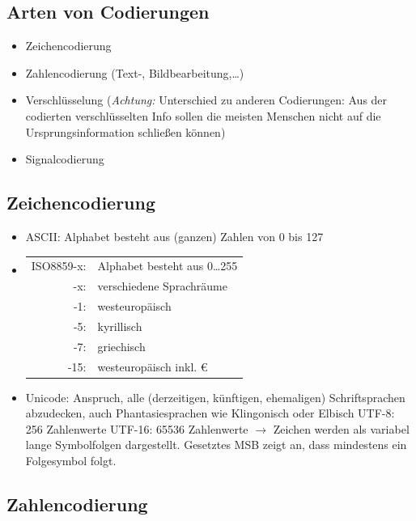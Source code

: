 \documentclass[10pt,a4paper]{scrartcl}
\begin{document}
	\subsection{Arten von Codierungen}
	\begin{itemize}
		\item Zeichencodierung
		\item Zahlencodierung (Text-, Bildbearbeitung,\dots)
		\item Verschlüsselung (\textit{Achtung:} Unterschied zu anderen Codierungen: Aus der codierten verschlüsselten Info sollen die meisten Menschen nicht auf die Ursprungsinformation schließen können)
		\item Signalcodierung
	\end{itemize}

	\subsection{Zeichencodierung}
	\begin{itemize}
		\item ASCII: Alphabet besteht aus (ganzen) Zahlen von 0 bis 127
		\item \begin{tabular}[t]{rl}
			ISO8859-x: & Alphabet besteht aus 0\dots255\\
			-x: & verschiedene Sprachräume\\
			-1: & westeuropäisch\\
			-5: & kyrillisch\\
			-7: & griechisch\\
		  -15: & westeuropäisch inkl. \euro{}
		\end{tabular}
		\item Unicode: Anspruch, alle (derzeitigen, künftigen, ehemaligen) Schriftsprachen abzudecken, auch Phantasiesprachen wie Klingonisch oder Elbisch
		\subitem UTF-8: 256 Zahlenwerte
		\subitem UTF-16: 65536 Zahlenwerte
		\subitem$ \rightarrow $ Zeichen werden als variabel lange Symbolfolgen dargestellt. Gesetztes MSB zeigt an, dass mindestens ein Folgesymbol folgt.
	\end{itemize}
	\subsection{Zahlencodierung}
\end{document}
